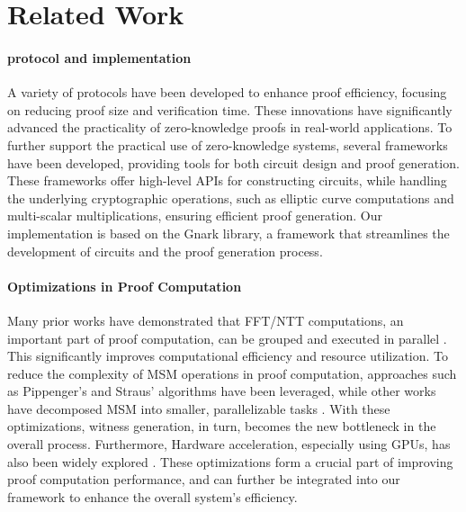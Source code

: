 \section{Related Work}
\label{sec:related_work}
\paragraph{\zk protocol and implementation}
A variety of \zk protocols\cite{groth2016size, gabizon2019plonk, chen2023hyperplonk, setty2020spartan, chiesa2020marlin, wahby2018doubly, bunz2018bulletproofs} have been developed to enhance proof efficiency, focusing on reducing proof size and verification time. These innovations have significantly advanced the practicality of zero-knowledge proofs in real-world applications. To further support the practical use of zero-knowledge systems, several frameworks\cite{gnark, libsnark, circom} have been developed, providing tools for both circuit design and proof generation. These frameworks offer high-level APIs for constructing circuits, while handling the underlying cryptographic operations, such as elliptic curve computations and multi-scalar multiplications, ensuring efficient proof generation. Our implementation is based on the Gnark library, a framework that streamlines the development of \zk circuits and the proof generation process.


\paragraph{Optimizations in Proof Computation}  
Many prior works have demonstrated that FFT/NTT computations, an important part of proof computation,  can be grouped and executed in parallel \cite{chen2017big, dai2016cuhe, goey2021accelerating, kim2020accelerating}. This significantly improves computational efficiency and resource utilization. To reduce the complexity of MSM operations in proof computation, approaches such as Pippenger’s \cite{pippenger1976evaluation} and Straus’ \cite{straus1964addition} algorithms have been leveraged, while other works have decomposed MSM into smaller, parallelizable tasks \cite{zhang2021pipezk, ma2023gzkp}. 
With these optimizations, witness generation, in turn, becomes the new bottleneck in the overall process.  Furthermore, Hardware acceleration, especially using GPUs, has also been widely explored \cite{chen2017big, dai2016cuhe, goey2021accelerating, kim2020accelerating, ma2023gzkp, zhang2021pipezk, ji2024accelerating, govindaraju2008high}. These optimizations form a crucial part of improving proof computation performance, and can further be integrated into our framework to enhance the overall system's efficiency.

